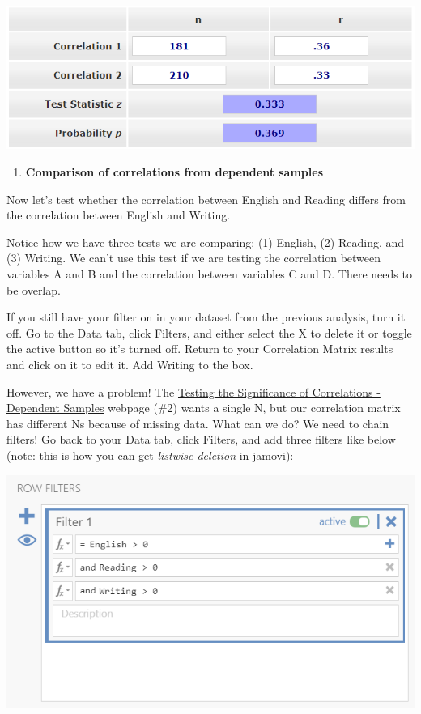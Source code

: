 \documentclass[
]{book}
\providecommand{\tightlist}{%
  \setlength{\itemsep}{0pt}\setlength{\parskip}{0pt}}
\begin{document}
\includegraphics{images/08-correlation/compare-correlations-independent.png}

\begin{enumerate}
\def\labelenumi{\arabic{enumi}.}
\setcounter{enumi}{1}
\tightlist
\item
  \textbf{Comparison of correlations from dependent samples}
\end{enumerate}

Now let's test whether the correlation between English and Reading differs from the correlation between English and Writing.

Notice how we have three tests we are comparing: (1) English, (2) Reading, and (3) Writing. We can't use this test if we are testing the correlation between variables A and B and the correlation between variables C and D. There needs to be overlap.

If you still have your filter on in your dataset from the previous analysis, turn it off. Go to the Data tab, click Filters, and either select the X to delete it or toggle the active button so it's turned off. Return to your Correlation Matrix results and click on it to edit it. Add Writing to the box.

However, we have a problem! The \href{https://www.psychometrica.de/correlation.html\#dependent}{Testing the Significance of Correlations - Dependent Samples} webpage (\#2) wants a single N, but our correlation matrix has different Ns because of missing data. What can we do? We need to chain filters! Go back to your Data tab, click Filters, and add three filters like below (note: this is how you can get \emph{listwise deletion} in jamovi):

\includegraphics{images/08-correlation/correlation-filters.png}
\end{document}
